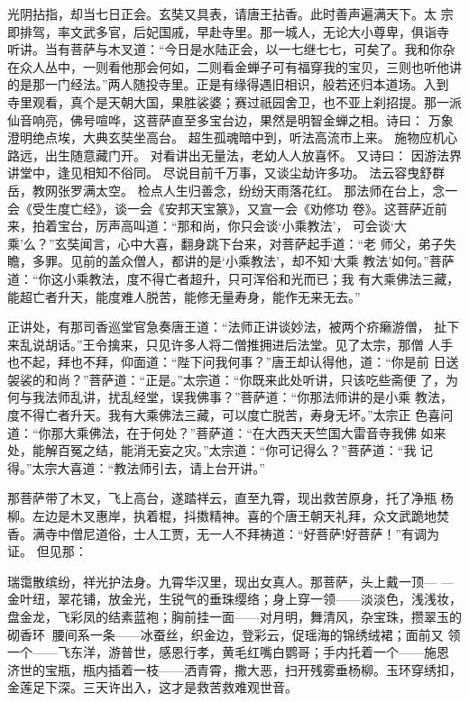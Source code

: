 光阴拈指，却当七日正会。玄奘又具表，请唐王拈香。此时善声遍满天下。太
宗即排驾，率文武多官，后妃国戚，早赴寺里。那一城人，无论大小尊卑，俱诣寺
听讲。当有菩萨与木叉道：“今日是水陆正会，以一七继七七，可矣了。我和你杂
在众人丛中，一则看他那会何如，二则看金蝉子可有福穿我的宝贝，三则也听他讲
的是那一门经法。”两人随投寺里。正是有缘得遇旧相识，般若还归本道场。入到
寺里观看，真个是天朝大国，果胜裟婆；赛过祇园舍卫，也不亚上刹招提。那一派
仙音响亮，佛号喧哗，这菩萨直至多宝台边，果然是明智金蝉之相。诗曰：
万象澄明绝点埃，大典玄奘坐高台。
超生孤魂暗中到，听法高流市上来。
施物应机心路远，出生随意藏门开。
对看讲出无量法，老幼人人放喜怀。
又诗曰：
因游法界讲堂中，逢见相知不俗同。
尽说目前千万事，又谈尘劫许多功。
法云容曳舒群岳，教网张罗满太空。
检点人生归善念，纷纷天雨落花红。
那法师在台上，念一会《受生度亡经》，谈一会《安邦天宝篆》，又宣一会《劝修功
卷》。这菩萨近前来，拍着宝台，厉声高叫道：“那和尚，你只会谈‘小乘教法’，
可会谈‘大乘’么？”玄奘闻言，心中大喜，翻身跳下台来，对菩萨起手道：“老
师父，弟子失瞻，多罪。见前的盖众僧人，都讲的是‘小乘教法’，却不知‘大乘
教法’如何。”菩萨道：“你这小乘教法，度不得亡者超升，只可浑俗和光而已；我
有大乘佛法三藏，能超亡者升天，能度难人脱苦，能修无量寿身，能作无来无去。”

正讲处，有那司香巡堂官急奏唐王道：“法师正讲谈妙法，被两个疥癞游僧，
扯下来乱说胡话。”王令擒来，只见许多人将二僧推拥进后法堂。见了太宗，那僧
人手也不起，拜也不拜，仰面道：“陛下问我何事？”唐王却认得他，道：“你是前
日送袈裟的和尚？”菩萨道：“正是。”太宗道：“你既来此处听讲，只该吃些斋便
了，为何与我法师乱讲，扰乱经堂，误我佛事？”菩萨道：“你那法师讲的是小乘
教法，度不得亡者升天。我有大乘佛法三藏，可以度亡脱苦，寿身无坏。”太宗正
色喜问道：“你那大乘佛法，在于何处？”菩萨道：“在大西天天竺国大雷音寺我佛
如来处，能解百冤之结，能消无妄之灾。”太宗道：“你可记得么？”菩萨道：“我
记得。”太宗大喜道：“教法师引去，请上台开讲。”

那菩萨带了木叉，飞上高台，遂踏祥云，直至九霄，现出救苦原身，托了净瓶
杨柳。左边是木叉惠岸，执着棍，抖擞精神。喜的个唐王朝天礼拜，众文武跪地焚
香。满寺中僧尼道俗，士人工贾，无一人不拜祷道：“好菩萨!好菩萨！”有调为证。
但见那：

瑞霭散缤纷，祥光护法身。九霄华汉里，现出女真人。那菩萨，头上戴一顶—
—金叶纽，翠花铺，放金光，生锐气的垂珠缨络；身上穿一领——淡淡色，浅浅妆，
盘金龙，飞彩凤的结素蓝袍；胸前挂一面——对月明，舞清风，杂宝珠，攒翠玉的
砌香环；腰间系一条——冰蚕丝，织金边，登彩云，促瑶海的锦绣绒裙；面前又
领一个——飞东洋，游普世，感恩行孝，黄毛红嘴白鹦哥；手内托着一个——施恩
济世的宝瓶，瓶内插着一枝——洒青霄，撒大恶，扫开残雾垂杨柳。玉环穿绣扣，
金莲足下深。三天许出入，这才是救苦救难观世音。

